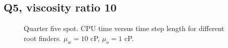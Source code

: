 \documentclass[a4paper,12pt]{report}
\begin{document}
%

\subsection{Q5, viscosity ratio 10}
\begin{figure}[!ht]
\begin{center}

\end{center}
\caption{Quarter five spot. CPU time versus time step length for different root finders. $\mu_w = 10$ cP, $\mu_o = 1$ cP.}
\end{figure}

%
\end{document}
